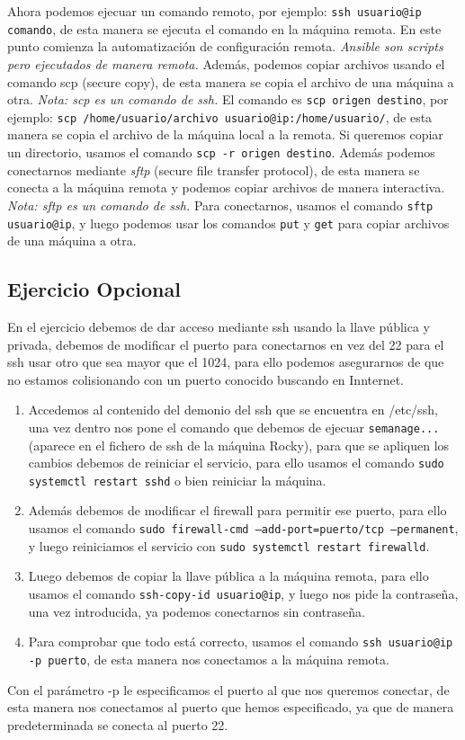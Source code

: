 Ahora podemos ejecuar un comando remoto, por ejemplo: \texttt{ssh usuario@ip comando}, de esta manera se ejecuta el comando en la máquina remota. En este punto comienza la automatización de configuración remota. \textit{Ansible son scripts pero ejecutados de manera remota.} Además, podemos copiar archivos usando el comando scp (secure copy), de esta manera se copia el archivo de una máquina a otra. \textit{Nota: scp es un comando de ssh.} El comando es \texttt{scp origen destino}, por ejemplo: \texttt{scp /home/usuario/archivo usuario@ip:/home/usuario/}, de esta manera se copia el archivo de la máquina local a la remota. Si queremos copiar un directorio, usamos el comando \texttt{scp -r origen destino}. Además podemos conectarnos mediante \textit{sftp} (secure file transfer protocol), de esta manera se conecta a la máquina remota y podemos copiar archivos de manera interactiva. \textit{Nota: sftp es un comando de ssh.} Para conectarnos, usamos el comando \texttt{sftp usuario@ip}, y luego podemos usar los comandos \texttt{put} y \texttt{get} para copiar archivos de una máquina a otra.

\subsection{Ejercicio Opcional}

En el ejercicio debemos de dar acceso mediante ssh usando la llave pública y privada, debemos de modificar el puerto para conectarnos en vez del 22 para el ssh usar otro que sea mayor que el 1024, para ello podemos asegurarnos de que no estamos colisionando con un puerto conocido buscando en Innternet.

\begin{enumerate}
    \item Accedemos al contenido del demonio del ssh que se encuentra en /etc/ssh, una vez dentro nos pone el comando que debemos de ejecuar \texttt{semanage...} (aparece en el fichero de ssh de la máquina Rocky), para que se apliquen los cambios debemos de reiniciar el servicio, para ello usamos el comando \texttt{sudo systemctl restart sshd} o bien reiniciar la máquina.
    \item Además debemos de modificar el firewall para permitir ese puerto, para ello usamos el comando \texttt{sudo firewall-cmd --add-port=puerto/tcp --permanent}, y luego reiniciamos el servicio con \texttt{sudo systemctl restart firewalld}.
    \item Luego debemos de copiar la llave pública a la máquina remota, para ello usamos el comando \texttt{ssh-copy-id usuario@ip}, y luego nos pide la contraseña, una vez introducida, ya podemos conectarnos sin contraseña.
    \item Para comprobar que todo está correcto, usamos el comando \texttt{ssh usuario@ip -p puerto}, de esta manera nos conectamos a la máquina remota.
\end{enumerate}

Con el parámetro -p le especificamos el puerto al que nos queremos conectar, de esta manera nos conectamos al puerto que hemos especificado, ya que de manera predeterminada se conecta al puerto 22.